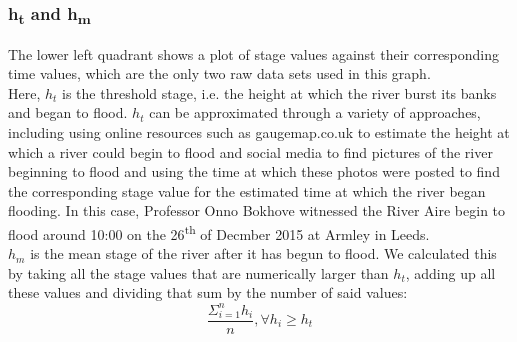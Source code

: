 \documentclass[11 pt, a4paper]{article}
\begin{document}
\subsubsection{h\textsubscript{t} and h\textsubscript{m}}
The lower left quadrant shows a plot of stage values against their corresponding time values, which are the only two raw data sets used in this graph. \\
Here, $h_t$ is the threshold stage, i.e. the height at which the river burst its banks and began to flood. $h_t$ can be approximated through a variety of approaches, including using online resources such as gaugemap.co.uk to estimate the height at which a river could begin to flood and social media to find pictures of the river beginning to flood and using the time at which these photos were posted to find the corresponding stage value for the estimated time at which the river began flooding. In this case, Professor Onno Bokhove witnessed the River Aire begin to flood around 10:00 on the 26\textsuperscript{th} of Decmber 2015 at Armley in Leeds.\\
$h_m$ is the mean stage of the river after it has begun to flood. We calculated this by taking all the stage values that are numerically larger than $h_t$, adding up all these values and dividing that sum by the number of said values: \[\frac{\Sigma_{i=1}^{n} h_i}{n},\forall h_i\geq h_t\]\\
\end{document}
